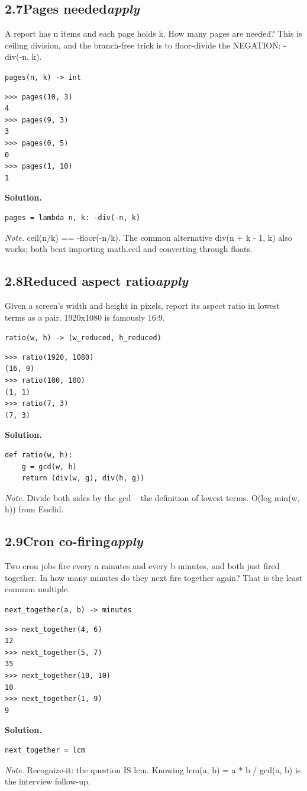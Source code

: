 \documentclass[10pt,letterpaper]{book}
\begin{document}
\subsection*{2.7\quad Pages needed\hfill\textnormal{\textit{apply}}}
A report has n items and each page holds k. How many pages are needed? This is ceiling division, and the branch-free trick is to floor-divide the NEGATION: -div(-n, k).

\noindent\texttt{pages(n, k) -> int}
\begin{lstlisting}[style=ex]
>>> pages(10, 3)
4
>>> pages(9, 3)
3
>>> pages(0, 5)
0
>>> pages(1, 10)
1
\end{lstlisting}
\noindent\textbf{Solution.}
\begin{lstlisting}[style=code]
pages = lambda n, k: -div(-n, k)
\end{lstlisting}
\noindent\textit{Note.} ceil(n/k) == -floor(-n/k). The common alternative div(n + k - 1, k) also works; both beat importing math.ceil and converting through floats.

\subsection*{2.8\quad Reduced aspect ratio\hfill\textnormal{\textit{apply}}}
Given a screen's width and height in pixels, report its aspect ratio in lowest terms as a pair. 1920x1080 is famously 16:9.

\noindent\texttt{ratio(w, h) -> (w\_reduced, h\_reduced)}
\begin{lstlisting}[style=ex]
>>> ratio(1920, 1080)
(16, 9)
>>> ratio(100, 100)
(1, 1)
>>> ratio(7, 3)
(7, 3)
\end{lstlisting}
\noindent\textbf{Solution.}
\begin{lstlisting}[style=code]
def ratio(w, h):
    g = gcd(w, h)
    return (div(w, g), div(h, g))
\end{lstlisting}
\noindent\textit{Note.} Divide both sides by the gcd -- the definition of lowest terms. O(log min(w, h)) from Euclid.

\subsection*{2.9\quad Cron co-firing\hfill\textnormal{\textit{apply}}}
Two cron jobs fire every a minutes and every b minutes, and both just fired together. In how many minutes do they next fire together again? That is the least common multiple.

\noindent\texttt{next\_together(a, b) -> minutes}
\begin{lstlisting}[style=ex]
>>> next_together(4, 6)
12
>>> next_together(5, 7)
35
>>> next_together(10, 10)
10
>>> next_together(1, 9)
9
\end{lstlisting}
\noindent\textbf{Solution.}
\begin{lstlisting}[style=code]
next_together = lcm
\end{lstlisting}
\noindent\textit{Note.} Recognize-it: the question IS lcm. Knowing lcm(a, b) = a * b / gcd(a, b) is the interview follow-up.
\end{document}
